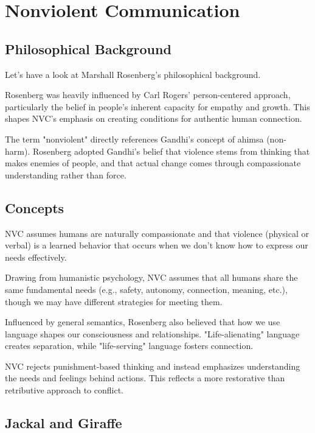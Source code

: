 %
%

\pagebreak
\section{Nonviolent Communication}

\onehalfspacing

\subsection{Philosophical Background}

Let's have a look at Marshall Rosenberg's philosophical background.

Rosenberg was heavily influenced by Carl Rogers' person-centered approach, particularly the belief in people's inherent capacity for empathy and growth. This shapes NVC's emphasis on creating conditions for authentic human connection.

The term "nonviolent" directly references Gandhi's concept of ahimsa (non-harm). Rosenberg adopted Gandhi's belief that violence stems from thinking that makes enemies of people, and that actual change comes through compassionate understanding rather than force.

\subsection{Concepts}

NVC assumes humans are naturally compassionate and that violence (physical or verbal) is a learned behavior that occurs when we don't know how to express our needs effectively.

Drawing from humanistic psychology, NVC assumes that all humans share the same fundamental needs (e.g., safety, autonomy, connection, meaning, etc.), though we may have different strategies for meeting them.

Influenced by general semantics, Rosenberg also believed that how we use language shapes our consciousness and relationships. "Life-alienating" language creates separation, while "life-serving" language fosters connection.

NVC rejects punishment-based thinking and instead emphasizes understanding the needs and feelings behind actions. This reflects a more restorative than retributive approach to conflict.

\subsection{Jackal and Giraffe}


